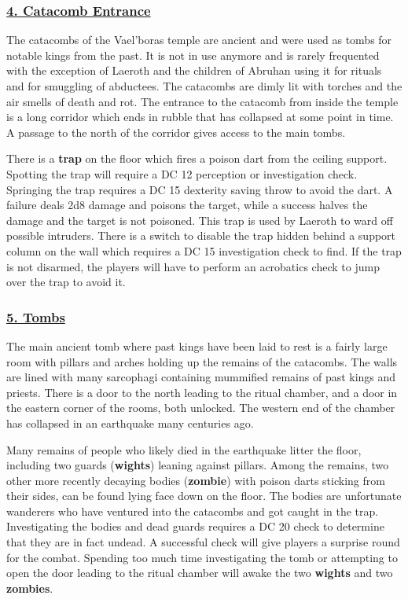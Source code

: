\begin{multicols*}{2}
\subsubsection*{\underline{4. Catacomb Entrance}}
The catacombs of the Vael'boras temple are ancient and were used  as tombs for notable kings from the past. It is not in use anymore and is rarely frequented with the exception of Laeroth and the children of Abruhan using it for rituals and for smuggling of abductees. The catacombs are dimly lit with torches and the air smells of death and rot. The entrance to the catacomb from inside the temple is a long corridor which ends in rubble that has collapsed at some point in time. A passage to the north of the corridor gives access to the main tombs. 

There is a \textbf{trap} on the floor which fires a poison dart from the ceiling support. Spotting the trap will require a DC 12 perception or investigation check. Springing the trap requires a DC 15 dexterity saving throw to avoid the dart. A failure deals 2d8 damage and poisons the target, while a success halves the damage and the target is not poisoned. This trap is used by Laeroth to ward off possible intruders. There is a switch to disable the trap hidden behind a support column on the wall which requires a DC 15 investigation check to find. If the trap is not disarmed, the players will have to perform an acrobatics check to jump over the trap to avoid it.

\subsubsection*{\underline{5. Tombs}}
The main ancient tomb where past kings have been laid to rest is a fairly large room with pillars and arches holding up the remains of the catacombs. The walls are lined with many sarcophagi containing mummified remains of past kings and priests. There is a door to the north leading to the ritual chamber, and a door in the eastern corner of the rooms, both unlocked. The western end of the chamber has collapsed in an earthquake many centuries ago. 

Many remains of people who likely died in the earthquake litter the floor, including two guards (\textbf{wights}) leaning against pillars. Among the remains, two other more recently decaying bodies (\textbf{zombie}) with poison darts sticking from their sides, can be found lying face down on the floor. The bodies are unfortunate wanderers who have ventured into the catacombs and got caught in the trap. Investigating the bodies and dead guards requires a DC 20 check to determine that they are in fact undead. A successful check will give players a surprise round for the combat. Spending too much time investigating the tomb or attempting to open the door leading to the ritual chamber will awake the two \textbf{wights} and two \textbf{zombies}.



\end{multicols*}

